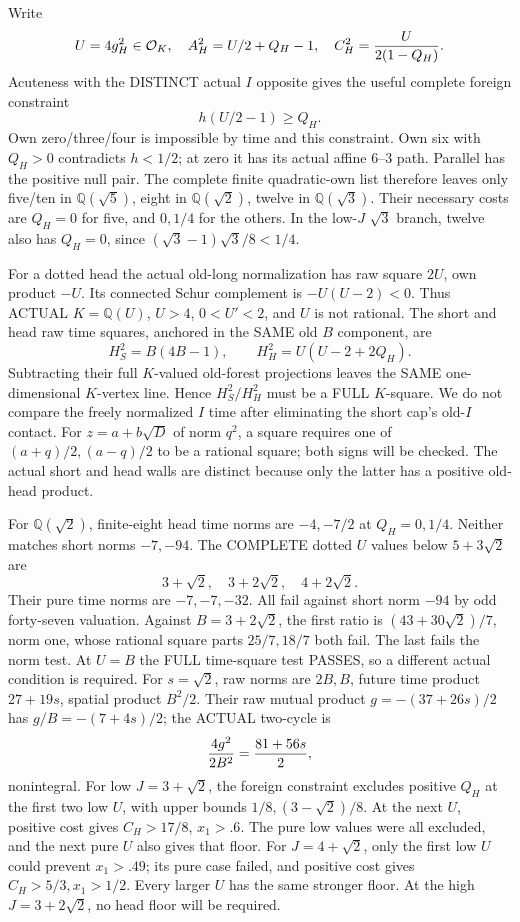 \documentclass[11pt]{article}
\begin{document}
Write
\[
 U=4g_H^2\in\mathcal O_K,\quad
 A_H^2=U/2+Q_H-1,\quad
 C_H^2={U\over2(1-Q_H)} .
\]
Acuteness with the DISTINCT actual \(I\)
opposite gives the useful complete foreign
constraint
\[
                             h(U/2-1)\ge Q_H .
\]
Own zero/three/four is impossible by time
and this constraint.
Own six with \(Q_H>0\) contradicts
\(h<1/2\); at zero it has its actual
affine \(6\)--\(3\) path.
Parallel has the positive null pair.
The complete finite quadratic-own list
therefore leaves only five/ten in
\(\mathbb Q(\sqrt5)\), eight in
\(\mathbb Q(\sqrt2)\), twelve in
\(\mathbb Q(\sqrt3)\).
Their necessary costs are \(Q_H=0\)
for five, and \(0,1/4\) for the others.
In the low-\(J\) \(\sqrt3\) branch,
twelve also has \(Q_H=0\), since
\((\sqrt3-1)\sqrt3/8<1/4\).

For a dotted head the actual
old-long normalization has raw square
\(2U\), own product \(-U\).
Its connected Schur complement is
\(-U(U-2)<0\).
Thus ACTUAL \(K=\mathbb Q(U)\),
\(U>4\), \(0<U'<2\), and \(U\) is
not rational.
The short and head raw time squares,
anchored in the SAME old \(B\) component,
are
\[
                        H_S^2=B(4B-1),\qquad
                        H_H^2=U(U-2+2Q_H).
\]
Subtracting their full \(K\)-valued
old-forest projections leaves the SAME
one-dimensional \(K\)-vertex line.
Hence \(H_S^2/H_H^2\) must be a FULL
\(K\)-square.
We do not compare the freely normalized
\(I\) time after eliminating the short
cap's old-\(I\) contact.
For \(z=a+b\sqrt D\) of norm \(q^2\),
a square requires one of
\((a+q)/2,(a-q)/2\) to be a rational
square; both signs will be checked.
The actual short and head walls are
distinct because only the latter has
a positive old-head product.

For \(\mathbb Q(\sqrt2)\), finite-eight
head time norms are \(-4,-7/2\)
at \(Q_H=0,1/4\).
Neither matches short norms \(-7,-94\).
The COMPLETE dotted \(U\) values below
\(5+3\sqrt2\) are
\[
                         3+\sqrt2,\quad3+2\sqrt2,\quad4+2\sqrt2 .
\]
Their pure time norms are \(-7,-7,-32\).
All fail against short norm \(-94\)
by odd forty-seven valuation.
Against \(B=3+2\sqrt2\), the first
ratio is \((43+30\sqrt2)/7\),
norm one, whose rational square parts
\(25/7,18/7\) both fail.
The last fails the norm test.
At \(U=B\) the FULL time-square test
PASSES, so a different actual condition
is required.
For \(s=\sqrt2\), raw norms are \(2B,B\),
future time product \(27+19s\), spatial
product \(B^2/2\).
Their raw mutual product \(g=-(37+26s)/2\)
has \(g/B=-(7+4s)/2\); the ACTUAL
two-cycle is
\[
                          {4g^2\over2B^2}={81+56s\over2},
\]
nonintegral.
For low \(J=3+\sqrt2\), the foreign
constraint excludes positive \(Q_H\)
at the first two low \(U\), with upper
bounds \(1/8,(3-\sqrt2)/8\).
At the next \(U\), positive cost gives
\(C_H>17/8\), \(x_1>.6\).
The pure low values were all excluded,
and the next pure \(U\) also gives
that floor.
For \(J=4+\sqrt2\), only the first
low \(U\) could prevent \(x_1>.49\);
its pure case failed, and positive
cost gives \(C_H>5/3,x_1>1/2\).
Every larger \(U\) has the same stronger
floor.
At the high \(J=3+2\sqrt2\), no head
floor will be required.
\end{document}
